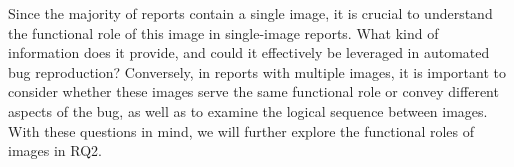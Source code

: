 Since the majority of reports contain a single image, it is crucial to understand the functional role of this image in single-image reports. What kind of information does it provide, and could it effectively be leveraged in automated bug reproduction? Conversely, in reports with multiple images, it is important to consider whether these images serve the same functional role or convey different aspects of the bug, as well as to examine the logical sequence between images. With these questions in mind, we will further explore the functional roles of images in RQ2.